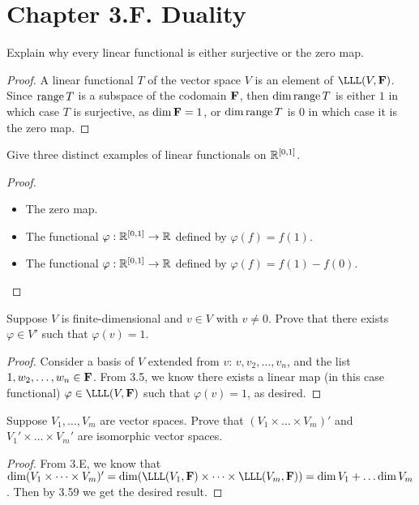\section*{Chapter 3.F. Duality}


\begin{exercise}{1}
  Explain why every linear functional is either surjective or the zero map.
\end{exercise}
\begin{proof}
 A linear functional $T$ of the vector space $V$ is an element of $\LLL(V,\bF)$. Since $\operatorname*{range} T$ is a subspace of the codomain $\mathbf{F}$, then $\dim\operatorname*{range} T$ is either $1$ in which case $T$ is surjective, as $\dim\mathbf{F}=1$, or $\dim\operatorname*{range} T$ is $0$ in which case it is the zero map.
\end{proof}

\begin{exercise}{2}
  Give three distinct examples of linear functionals on $\mathbb{R}^{[0,1]}$.
\end{exercise}
\begin{proof}
 \begin{itemize}
     \item The zero map.
     \item The functional $\varphi:\mathbb{R}^{[0,1]}\rightarrow\mathbb{R}$ defined by $\varphi(f)=f(1)$.
     \item The functional $\varphi:\mathbb{R}^{[0,1]}\rightarrow\mathbb{R}$ defined by $\varphi(f)=f(1)-f(0)$.
 \end{itemize}
\end{proof}

\begin{exercise}{3}
  Suppose $V$ is finite-dimensional and $v\in V$ with $v\neq 0$. Prove that there exists $\varphi\in V'$ such that $\varphi(v)=1$.
\end{exercise}
\begin{proof}
 Consider a basis of $V$ extended from $v$: $v,v_2,\dots,v_n$, and the list\\ $1,w_2,\dots,w_n\in\mathbf{F}$. From 3.5, we know there exists a linear map (in this case functional) $\varphi\in\LLL(V,\bF)$ such that $\varphi(v)=1$, as desired.
\end{proof}

\begin{exercise}{5}
  Suppose $V_1,\dots,V_m$ are vector spaces. Prove that $(V_1\times\dots\times V_m)'$ and $V_1'\times\dots\times V_m'$ are isomorphic vector spaces.
\end{exercise}
\begin{proof}
 From 3.E, we know that $\dim(V_1\times\dots\times V_m)'= \dim(\LLL(V_1,\bF)\times\dots\times \LLL(V_m,\bF))= \dim V_1+\dots\dim V_m$. Then by 3.59 we get the desired result.
\end{proof}

